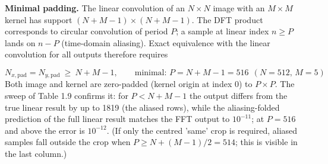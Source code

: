 \documentclass[10pt,a4paper]{article}
\begin{document}
\textbf{Minimal padding.} The linear convolution of an $N\times N$ image with an $M\times M$ kernel has support $(N+M-1)\times(N+M-1)$. The DFT product corresponds to circular convolution of period $P$; a sample at linear index $n\ge P$ lands on $n-P$ (time-domain aliasing). Exact equivalence with the linear convolution for all outputs therefore requires

\begin{equation}N_{x,\mathrm{pad}}=N_{y,\mathrm{pad}}\ \ge\ N+M-1 ,\qquad \text{minimal: } P=N+M-1=516\ \ (N=512,\,M=5)\end{equation}
Both image and kernel are zero-padded (kernel origin at index 0) to $P\times P$. The sweep of Table 1.9 confirms it: for $P<N+M-1$ the output differs from the true linear result by up to 1819 (the aliased rows), while the aliasing-folded prediction of the full linear result matches the FFT output to $10^{-11}$; at $P=516$ and above the error is $10^{-12}$. (If only the centred 'same' crop is required, aliased samples fall outside the crop when $P\ge N+(M-1)/2=514$; this is visible in the last column.)
\end{document}
